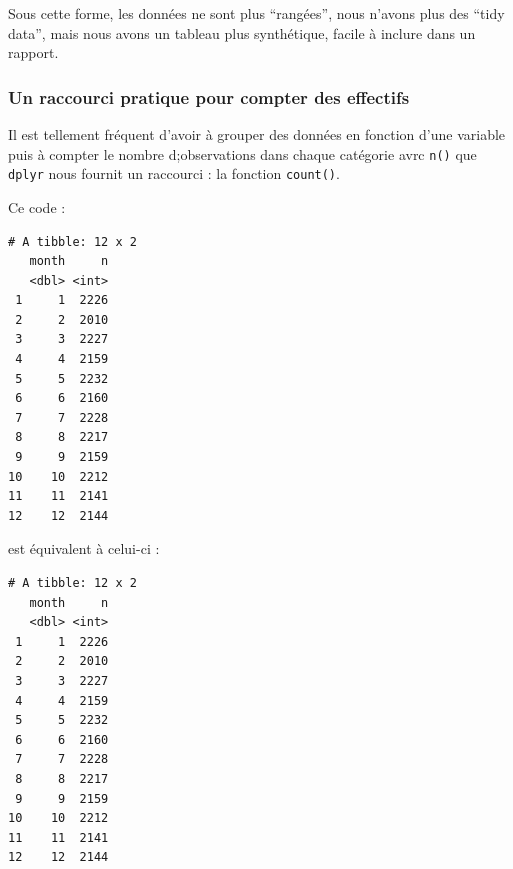 \documentclass[a4paperpaper,]{article}
\newenvironment{Shaded}{\begin{snugshade}}{\end{snugshade}}
\newcommand{\DataTypeTok}[1]{\textcolor[rgb]{0.00,0.34,0.68}{#1}}
\newcommand{\KeywordTok}[1]{\textcolor[rgb]{0.12,0.11,0.11}{\textbf{#1}}}
\newcommand{\NormalTok}[1]{\textcolor[rgb]{0.12,0.11,0.11}{#1}}
\newcommand{\OperatorTok}[1]{\textcolor[rgb]{0.12,0.11,0.11}{#1}}
\newcommand{\StringTok}[1]{\textcolor[rgb]{0.75,0.01,0.01}{#1}}
\begin{document}
Sous cette forme, les données ne sont plus ``rangées'', nous n'avons plus des ``tidy data'', mais nous avons un tableau plus synthétique, facile à inclure dans un rapport.

\hypertarget{un-raccourci-pratique-pour-compter-des-effectifs}{%
\subsubsection{Un raccourci pratique pour compter des effectifs}\label{un-raccourci-pratique-pour-compter-des-effectifs}}

Il est tellement fréquent d'avoir à grouper des données en fonction d'une variable puis à compter le nombre d;observations dans chaque catégorie avrc \texttt{n()} que \texttt{dplyr} nous fournit un raccourci : la fonction \texttt{count()}.

Ce code :

\begin{Shaded}
\end{Shaded}

\begin{verbatim}
# A tibble: 12 x 2
   month     n
   <dbl> <int>
 1     1  2226
 2     2  2010
 3     3  2227
 4     4  2159
 5     5  2232
 6     6  2160
 7     7  2228
 8     8  2217
 9     9  2159
10    10  2212
11    11  2141
12    12  2144
\end{verbatim}

est équivalent à celui-ci :

\begin{Shaded}
\end{Shaded}

\begin{verbatim}
# A tibble: 12 x 2
   month     n
   <dbl> <int>
 1     1  2226
 2     2  2010
 3     3  2227
 4     4  2159
 5     5  2232
 6     6  2160
 7     7  2228
 8     8  2217
 9     9  2159
10    10  2212
11    11  2141
12    12  2144
\end{verbatim}
\end{document}
